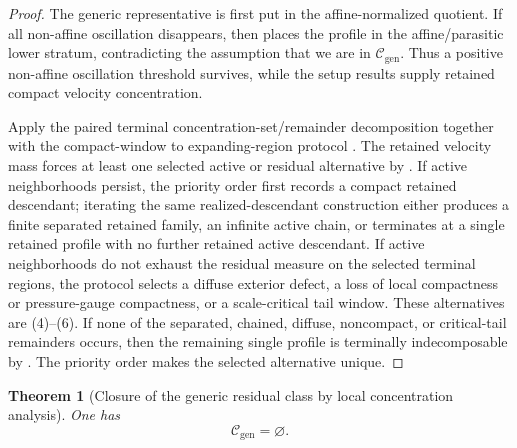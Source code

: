 \documentclass[11pt]{amsart}
\numberwithin{equation}{section}
\theoremstyle{plain}
\newtheorem{theorem}{Theorem}[section]
\theoremstyle{definition}
\theoremstyle{remark}
\newcommand{\Cgen}{\mathcal C_{\mathrm{gen}}}
\begin{document}
\begin{proof}
The generic representative is first put in the affine-normalized quotient.  If
all non-affine oscillation disappears, then
 places the profile in the
affine/parasitic lower stratum, contradicting the assumption that we are in
\(\Cgen\).  Thus a positive non-affine oscillation threshold survives, while the
setup results supply retained compact velocity concentration.

Apply the paired terminal concentration-set/remainder decomposition
 together with the compact-window to
expanding-region protocol
.  The retained velocity
mass forces at least one selected active or residual alternative by
.  If active neighborhoods persist, the
priority order first records a compact retained descendant; iterating the same
realized-descendant construction either produces a finite separated retained
family, an infinite active chain, or terminates at a single retained profile
with no further retained active descendant.  If active neighborhoods do not
exhaust the residual measure on the selected terminal regions, the protocol
selects a diffuse exterior defect, a loss of local compactness or pressure-gauge
compactness, or a scale-critical tail window.  These alternatives are
\textup{(4)}--\textup{(6)}.  If none of the separated, chained, diffuse,
noncompact, or critical-tail remainders occurs, then the remaining single
profile is terminally indecomposable by .
The priority order makes the selected alternative unique.
\end{proof}

\begin{theorem}[Closure of the generic residual class by local concentration analysis]
\label{thm:R4-final-closure}
One has
\[
   \Cgen=\varnothing .
\]
\end{theorem}
\end{document}
